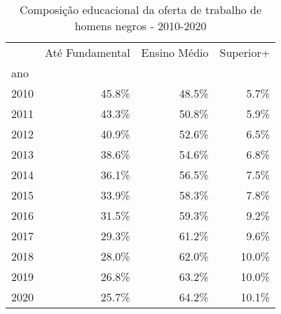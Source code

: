 \begin{table}
\centering
\caption{Composição educacional da oferta de trabalho de homens negros - 2010-2020}
\begin{tabular}{lrrr}
\toprule
{} &  Até Fundamental &  Ensino Médio &  Superior+ \\
ano  &                  &               &            \\
\midrule
2010 &            45.8\% &         48.5\% &       5.7\% \\
2011 &            43.3\% &         50.8\% &       5.9\% \\
2012 &            40.9\% &         52.6\% &       6.5\% \\
2013 &            38.6\% &         54.6\% &       6.8\% \\
2014 &            36.1\% &         56.5\% &       7.5\% \\
2015 &            33.9\% &         58.3\% &       7.8\% \\
2016 &            31.5\% &         59.3\% &       9.2\% \\
2017 &            29.3\% &         61.2\% &       9.6\% \\
2018 &            28.0\% &         62.0\% &      10.0\% \\
2019 &            26.8\% &         63.2\% &      10.0\% \\
2020 &            25.7\% &         64.2\% &      10.1\% \\
\bottomrule
\end{tabular}
\end{table}
